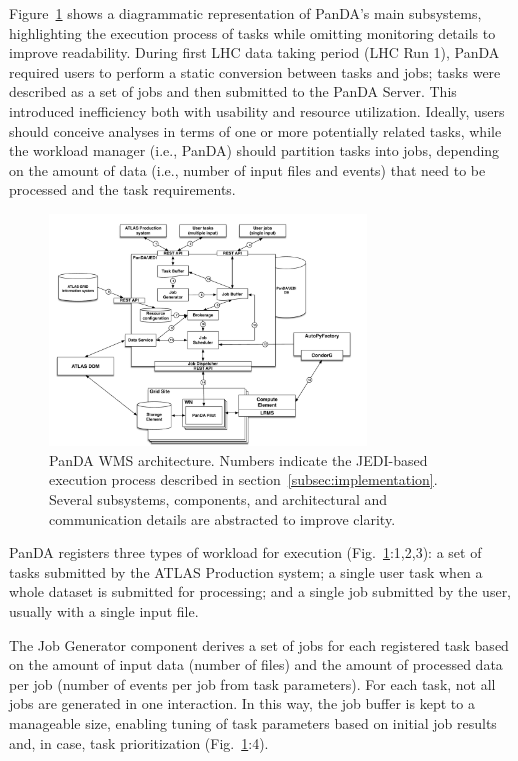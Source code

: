 Figure~\ref{fig:architecture} shows a diagrammatic representation of PanDA's
main subsystems, highlighting the execution process of tasks while omitting
monitoring details to improve readability. During first LHC data taking
period (LHC Run 1), PanDA required users to perform a static conversion
between tasks and jobs; tasks were described as a set of jobs and then
submitted to the PanDA Server. This introduced inefficiency both with
usability and resource utilization. Ideally, users should conceive analyses
in terms of one or more potentially related tasks, while the workload manager
(i.e., PanDA) should partition tasks into jobs, depending on the amount of
data (i.e., number of input files and events) that need to be processed and
the task requirements.

\begin{figure}
  \includegraphics[width=0.75\textwidth]{images/PanDA_WMS.pdf}
  \caption{PanDA WMS architecture. Numbers indicate the JEDI-based execution
           process described in section~\ref{subsec:implementation}. Several
           subsystems, components, and architectural and communication
           details are abstracted to improve
           clarity.}\label{fig:architecture}
\end{figure}

PanDA registers three types of workload for execution
(Fig.~\ref{fig:architecture}:1,2,3): a set of tasks submitted by the ATLAS
Production system; a single user task when a whole dataset is submitted for
processing; and a single job submitted by the user, usually with a single
input file.

The Job Generator component derives a set of jobs for each registered task
based on the amount of input data (number of files) and the amount of
processed data per job (number of events per job from task parameters). For
each task, not all jobs are generated in one interaction. In this way, the
job buffer is kept to a manageable size, enabling tuning of task parameters
based on initial job results and, in case, task prioritization
(Fig.~\ref{fig:architecture}:4).

